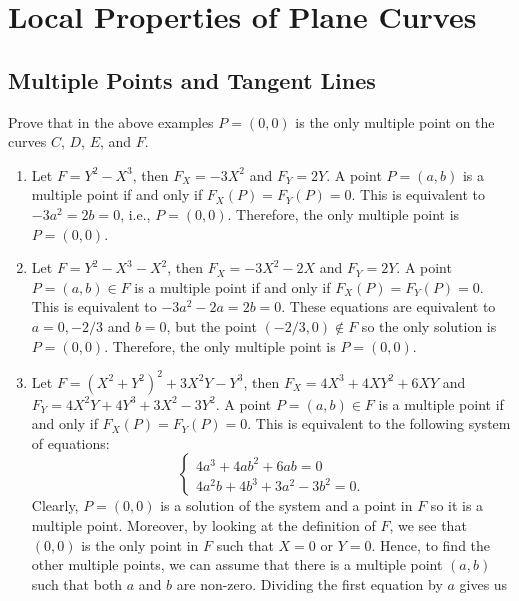 \chapter{Local Properties of Plane Curves}

\section{Multiple Points and Tangent Lines}

\begin{exercise}
    Prove that in the above examples $P = (0,0)$ is the only multiple point on the curves $C$, $D$, $E$, and $F$. \\
\end{exercise}

\begin{solution}
    \begin{enumerate}
        \item Let $F = Y^2 - X^3$, then $F_X = -3X^2$ and $F_Y = 2Y$. A point $P = (a,b)$ is a multiple point if and only if $F_X(P) = F_Y(P) = 0$. This is equivalent to $-3a^2 = 2b = 0$, i.e., $P = (0,0)$. Therefore, the only multiple point is $P = (0,0)$.
        \item Let $F = Y^2 - X^3 - X^2$, then $F_X = -3X^2 - 2X$ and $F_Y = 2Y$. A point $P = (a,b) \in F$ is a multiple point if and only if $F_X(P) = F_Y(P) = 0$. This is equivalent to $-3a^2 - 2a = 2b = 0$. These equations are equivalent to $a = 0, -2/3$ and $b = 0$, but the point $(-2/3, 0) \notin F$ so the only solution is $P = (0,0)$. Therefore, the only multiple point is $P = (0,0)$. 
        \item Let $F = (X^2 + Y^2)^2 + 3X^2Y - Y^3$, then $F_X = 4X^3 + 4XY^2 + 6XY$ and $F_Y = 4X^2Y + 4Y^3 + 3X^2 - 3Y^2$. A point $P = (a,b) \in F$ is a multiple point if and only if $F_X(P) = F_Y(P) = 0$. This is equivalent to the following system of equations:
        $$\begin{cases}
            4a^3 + 4ab^2 + 6ab = 0 \\
            4a^2b + 4b^3 + 3a^2 - 3b^2 = 0.
        \end{cases}$$
        Clearly, $P = (0,0)$ is a solution of the system and a point in $F$ so it is a multiple point. Moreover, by looking at the definition of $F$, we see that $(0,0)$ is the only point in $F$ such that $X = 0$ or $Y = 0$. Hence, to find the other multiple points, we can assume that there is a multiple point $(a,b)$ such that both $a$ and $b$ are non-zero. Dividing the first equation by $a$ gives us 

\end{enumerate}
\end{solution}
